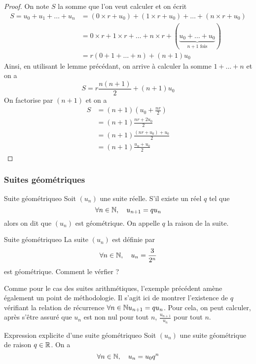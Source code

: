 \begin{proof}
On note $S$ la somme que l'on veut calculer et on écrit
\begin{align*}
	S=u_0+u_1+\dots+u_n &= (0\times r+u_0)+(1\times r+u_0)+\dots+(n\times r+u_0)\\
						&= 0\times r+1\times r+\dots+n\times r+(\underbrace{u_0+\dots+u_0}_{n+1\text{ fois}})\\
						&= r(0+1+\dots+n)+(n+1)u_0
\end{align*}
Ainsi, en utilisant le lemme précédant, on arrive à calculer la somme $1+\dots+n$ et on a 
\[S=r\frac{n(n+1)}2+(n+1)u_0\]
On factorise par $(n+1)$ et on a 
\begin{align*}
	S &= (n+1)\left(u_0+\frac{nr}2\right)\\
	  &= (n+1)\frac{nr+2u_0}2\\
	  &= (n+1)\frac{(nr+u_0)+u_0}2\\
	  &= (n+1)\frac{u_n+u_0}2
\end{align*}
\end{proof}

\subsubsection{Suites géométriques}
\begin{definition}{Suite géométrique}{o}
	Soit $(u_n)$ une suite réelle. S'il existe un réel $q$ tel que \[\forall n\in\mathbb{N},\quad u_{n+1}=qu_n\]
	alors on dit que $(u_n)$ est géométrique. On appelle $q$ la raison de la suite.
\end{definition}

\begin{exemple}{Suite géométrique}{o}
La suite $(u_n)$ est définie par \[\forall n\in\mathbb{N},\quad u_n=\frac3{2^n}\]
est géométrique. Comment le vérfier ?
\end{exemple}
Comme pour le cas des suites arithmétiques, l’exemple précédent amène également un point de méthodologie. Il s'agit ici de montrer l’existence de $q$ vérifiant la relation de récurrence $\forall n\in\mathbb{N} u_{n+1} = qu_n$. Pour cela, on peut calculer, après s'être assuré que $u_n$ est non nul pour tout $n$, $\frac{u_{n+1}}{u_n}$ pour tout $n$.


\begin{proposition}{Expression explicite d'une suite géométrique}{o}
	Soit $(u_n)$ une suite géométrique de raison $q\in\mathbb{R}$. On a \[\forall n\in\mathbb{N},\quad u_n=u_0q^n\]
\end{proposition}

